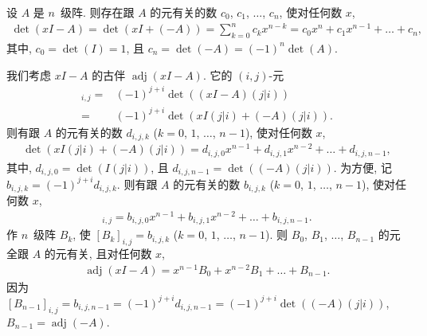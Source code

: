 \documentclass[../libro.tex]{subfiles}
\begin{document}
\begin{example}
    设 \(A\) 是 \(n\)~级阵.
    则存在跟 \(A\) 的元有关的数
    \(c_0\), \(c_1\), \(\dots\), \(c_n\),
    使对任何数 \(x\),
    \begin{align*}
        \det {(xI - A)}
        = \det {(xI + (-A))}
        = \sum_{k = 0}^{n} {c_k x^{n-k}}
        = c_0 x^n + c_1 x^{n-1} + \dots + c_n,
    \end{align*}
    其中,
    \(c_0 = \det {(I)} = 1\),
    且
    \(c_n = \det {(-A)} = (-1)^n \det {(A)}\).

    我们考虑 \(xI - A\) 的古伴
    \(\operatorname{adj} {(xI - A)}\).
    它的 \((i, j)\)-元
    \begin{align*}
        [\operatorname{adj} {(xI - A)}]_{i,j}
        = {} &
        (-1)^{j+i} \det {((xI - A)(j|i))}
        \\
        = {} &
        (-1)^{j+i} \det {(x I(j|i) + (-A)(j|i))}.
    \end{align*}
    则有跟 \(A\) 的元有关的数 \(d_{i,j,k}\)
    (\(k = 0\), \(1\), \(\dots\), \(n-1\)),
    使对任何数 \(x\),
    \begin{align*}
        \det {(x I(j|i) + (-A)(j|i))}
        = d_{i,j,0} x^{n-1}
        + d_{i,j,1} x^{n-2}
        + \dots + d_{i,j,n-1},
    \end{align*}
    其中,
    \(d_{i,j,0} = \det {(I(j|i))}\),
    且 \(d_{i,j,n-1} = \det {((-A)(j|i))}\).
    为方便, 记 \(b_{i,j,k} = (-1)^{j+i} d_{i,j,k}\).
    则有跟 \(A\) 的元有关的数 \(b_{i,j,k}\)
    (\(k = 0\), \(1\), \(\dots\), \(n-1\)),
    使对任何数 \(x\),
    \begin{align*}
        [\operatorname{adj} {(xI - A)}]_{i,j}
        = b_{i,j,0} x^{n-1}
        + b_{i,j,1} x^{n-2}
        + \dots + b_{i,j,n-1}.
    \end{align*}
    作 \(n\)~级阵 \(B_k\),
    使 \([B_k]_{i,j} = b_{i,j,k}\)
    (\(k = 0\), \(1\), \(\dots\), \(n-1\)).
    则 \(B_0\), \(B_1\), \(\dots\), \(B_{n-1}\)
    的元全跟 \(A\) 的元有关,
    且对任何数 \(x\),
    \begin{align*}
        \operatorname{adj} {(xI - A)}
        = x^{n-1} B_0 + x^{n-2} B_1 + \dots + B_{n-1}.
    \end{align*}
    因为
    \([B_{n-1}]_{i,j}
        = b_{i,j,n-1}
        = (-1)^{j+i} d_{i,j,n-1}
    = (-1)^{j+i} \det {((-A)(j|i))}\),
    \(B_{n-1} = \operatorname{adj} {(-A)}\).


\end{example}
\end{document}
